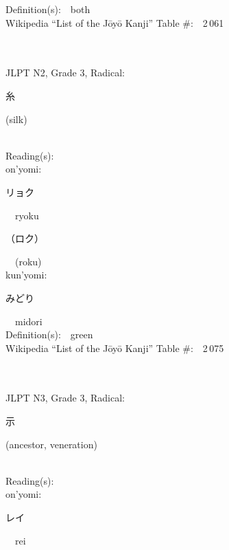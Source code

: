 \begin{multicols}{2}
Definition(s):\ \ both \\
Wikipedia ``List of the J\=oy\=o Kanji'' Table \#:\ \ 2\,061 \\
\ \ \\
{\fontsize{34pt}{40pt}  }\ \ \\  %
{JLPT N2, Grade 3, Radical:\ \ {\begin{CJK}{UTF8}{min} 糸 \end{CJK}} (silk) } \\
Reading(s):\ \ \\
{\hspace*{1em}}on'yomi:\ \ \\
{\hspace*{2em}}{\begin{CJK}{UTF8}{min} リョク \end{CJK}}\ \ ryoku\ \ \\
{\hspace*{2em}}{\begin{CJK}{UTF8}{min} （ロク） \end{CJK}}\ \ (roku)\ \ \\
{\hspace*{1em}}kun'yomi:\ \ \\
{\hspace*{2em}}{\begin{CJK}{UTF8}{min} みどり \end{CJK}}\ \ midori\ \ \\
Definition(s):\ \ green \\
Wikipedia ``List of the J\=oy\=o Kanji'' Table \#:\ \ 2\,075 \\
\ \ \\
{\fontsize{34pt}{40pt}  }\ \ \\  %
{JLPT N3, Grade 3, Radical:\ \ {\begin{CJK}{UTF8}{min} 示 \end{CJK}} (ancestor, veneration) } \\
Reading(s):\ \ \\
{\hspace*{1em}}on'yomi:\ \ \\
{\hspace*{2em}}{\begin{CJK}{UTF8}{min} レイ \end{CJK}}\ \ rei\ \ \\

\end{multicols}
